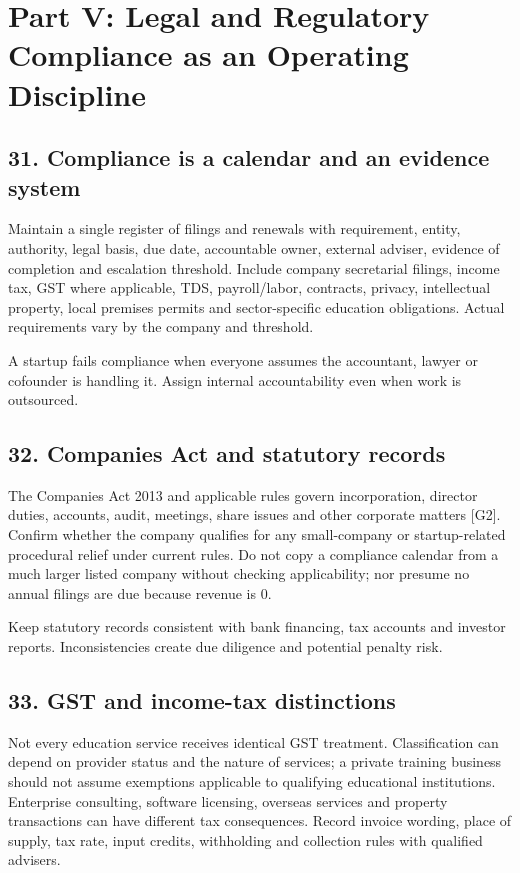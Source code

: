\section*{Part V: Legal and Regulatory Compliance as an Operating Discipline}

\subsection{31. Compliance is a calendar and an evidence system}

Maintain a single register of filings and renewals with requirement, entity, authority, legal basis, due date, accountable owner, external adviser, evidence of completion and escalation threshold. Include company secretarial filings, income tax, GST where applicable, TDS, payroll/labor, contracts, privacy, intellectual property, local premises permits and sector-specific education obligations. Actual requirements vary by the company and threshold.

A startup fails compliance when everyone assumes the accountant, lawyer or cofounder is handling it. Assign internal accountability even when work is outsourced.

\subsection{32. Companies Act and statutory records}

The Companies Act 2013 and applicable rules govern incorporation, director duties, accounts, audit, meetings, share issues and other corporate matters [G2]. Confirm whether the company qualifies for any small-company or startup-related procedural relief under current rules. Do not copy a compliance calendar from a much larger listed company without checking applicability; nor presume no annual filings are due because revenue is 0.

Keep statutory records consistent with bank financing, tax accounts and investor reports. Inconsistencies create due diligence and potential penalty risk.

\subsection{33. GST and income-tax distinctions}

Not every education service receives identical GST treatment. Classification can depend on provider status and the nature of services; a private training business should not assume exemptions applicable to qualifying educational institutions. Enterprise consulting, software licensing, overseas services and property transactions can have different tax consequences. Record invoice wording, place of supply, tax rate, input credits, withholding and collection rules with qualified advisers.

